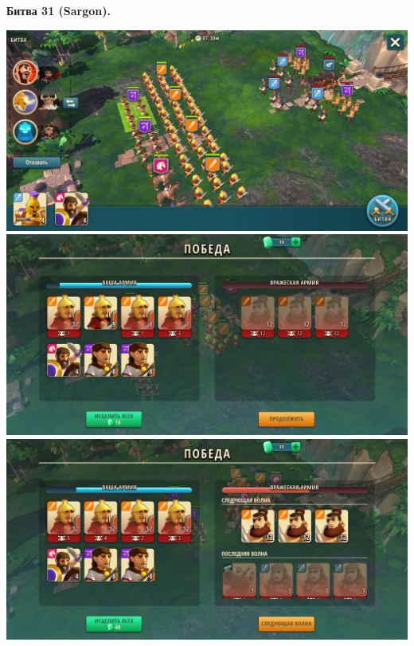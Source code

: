 \newpage
\begin{center}
	\hypertarget{fight31}{\textbf{Битва 31 (Sargon).}}
\end{center}
\noindent\includegraphics[width=\linewidth]{./parts/media/TreasureHunt/31/sargon/photo_2022-04-07_10-05-08.jpg} \newline
\noindent\includegraphics[width=\linewidth]{./parts/media/TreasureHunt/31/sargon/photo_2022-04-07_10-05-25.jpg} \newline
\noindent\includegraphics[width=\linewidth]{./parts/media/TreasureHunt/31/sargon/photo_2022-04-07_10-05-18.jpg} \newline
